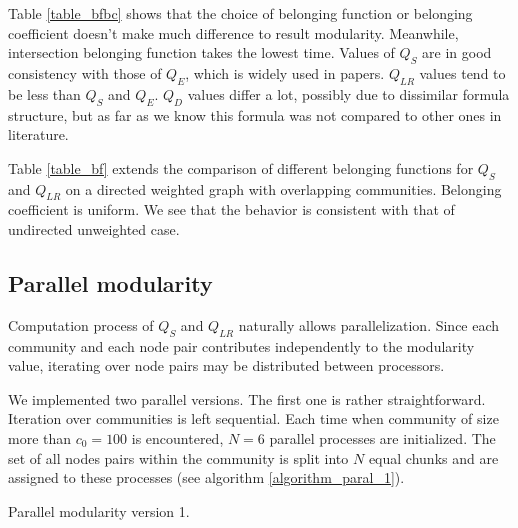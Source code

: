 \documentclass[a4paper,twocolumn]{article}
\begin{document}
Table \ref{table_bfbc} shows that the choice of belonging function or belonging coefficient doesn't make much difference to result modularity. Meanwhile, intersection belonging function takes the lowest time. Values of $Q_S$ are in good consistency with those of $Q_E$, which is widely used in papers. $Q_{LR}$ values tend to be less than $Q_S$ and $Q_E$. $Q_D$ values differ a lot, possibly due to dissimilar formula structure, but as far as we know this formula was not compared to other ones in literature.

Table \ref{table_bf} extends the comparison of different belonging functions for $Q_S$ and $Q_{LR}$ on a directed weighted graph with overlapping communities. Belonging coefficient is uniform. We see that the behavior is consistent with that of undirected unweighted case.


\subsection{Parallel modularity}

Computation process of $Q_S$ and $Q_{LR}$ naturally allows parallelization. Since each community and each node pair contributes independently to the modularity value, iterating over node pairs may be distributed between processors.

We implemented two parallel versions. The first one is rather straightforward. Iteration over communities is left sequential. Each time when community of size more than $c_0=100$ is encountered, $N=6$ parallel processes are initialized. The set of all nodes pairs within the community is split into $N$ equal chunks and are assigned to these processes (see algorithm \ref{algorithm_paral_1}). 

\begin{algorithm}[h!]
\caption{Parallel modularity version 1.}
\label{algorithm_paral_1}

\BlankLine

\end{algorithm}
\end{document}
